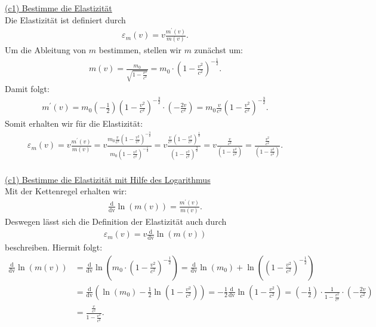 \underline{(c1) Bestimme die Elastizität}\\
Die Elastizität ist definiert durch
\begin{align*}
	\varepsilon_m(v) = v \frac{m^\prime(v)}{m(v)}.
\end{align*}
Um die Ableitung von $ m $ bestimmen, stellen wir $ m $ zunächst um:
\begin{align*}
	m(v)
	=
	\frac{m_0}{\sqrt{1 - \frac{v^2}{c^2}}}
	= 
	m_0 \cdot \left(1 - \frac{v^2}{c^2}\right)^{-\frac{1}{2}}.
\end{align*}
Damit folgt:
\begin{align*}
	m^\prime(v)
	=
	m_0 \left(-\frac{1}{2}\right) \left(1 - \frac{v^2}{c^2}\right)^{-\frac{3}{2}} \cdot  \left(-\frac{2v}{c^2}\right)
	=
	m_0 \frac{v}{c^2} \left(1 - \frac{v^2}{c^2}\right)^{-\frac{3}{2}}.
\end{align*}
Somit erhalten wir für die Elastizität:
\begin{align*}
	\varepsilon_m(v)
	=
	v \frac{m^\prime(v)}{m(v)}
	=
	v
	\frac{m_0 \frac{v}{c^2} \left(1 - \frac{v^2}{c^2}\right)^{-\frac{3}{2}}}{m_0  \left(1 - \frac{v^2}{c^2}\right)^{-\frac{1}{2}}}
	=
	v
	\frac{\frac{v}{c^2} \left(1 - \frac{v^2}{c^2}\right)^{\frac{1}{2}}}{ \left(1 - \frac{v^2}{c^2}\right)^{\frac{3}{2}}}
	=
	v
	\frac{\frac{v}{c^2} }{ \left(1 - \frac{v^2}{c^2}\right)}
	=
	\frac{\frac{v^2}{c^2} }{ \left(1 - \frac{v^2}{c^2}\right)}.
\end{align*}
\ \\
\underline{(c1) Bestimme die Elastizität mit Hilfe des Logarithmus}\\
Mit der Kettenregel erhalten wir:
\begin{align*}
	\frac{\mathrm{d}}{\mathrm{dv}} \ln(m(v))
	=
	\frac{m^\prime(v)}{m(v)}.
\end{align*}
Deswegen lässt sich die Definition der Elastizität auch durch 
\begin{align*}
		\varepsilon_m(v) = v \frac{\mathrm{d}}{\mathrm{dv}}\ln(m(v))
\end{align*}
beschreiben. Hiermit folgt:
\begin{align*}
	\frac{\mathrm{d}}{\mathrm{dv}}\ln(m(v))
	&=
	\frac{\mathrm{d}}{\mathrm{dv}}
	\ln\left(	m_0 \cdot \left(1 - \frac{v^2}{c^2}\right)^{-\frac{1}{2}}\right)
	=
	\frac{\mathrm{d}}{\mathrm{dv}}
	\ln\left(	m_0 \right)+ \ln\left( \left(1 - \frac{v^2}{c^2}\right)^{-\frac{1}{2}}\right)\\
	&=
	\frac{\mathrm{d}}{\mathrm{dv}}\left(
	\ln\left(	m_0 \right)- \frac{1}{2} \ln\left( 1 - \frac{v^2}{c^2}\right)
	\right)
	=
	- \frac{1}{2}\frac{\mathrm{d}}{\mathrm{dv}}\ln\left( 1 - \frac{v^2}{c^2}\right)
	=
	\left(- \frac{1}{2}\right) \cdot  \frac{1}{1 - \frac{v^2}{c^2}} \cdot \left(-\frac{2v}{c^2}\right)\\
	&=
	\frac{\frac{v}{c^2}}{1 - \frac{v^2}{c^2}}.
\end{align*}
